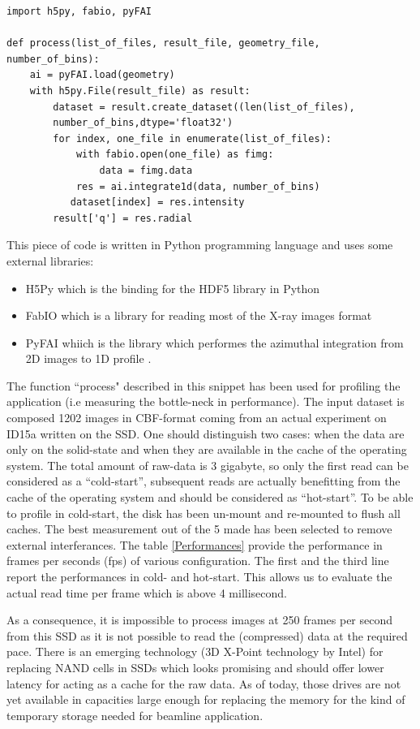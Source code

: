 \documentclass[preprint, pdf]{iucr}              %
\begin{document}
\label{sequential}
\begin{verbatim}
import h5py, fabio, pyFAI

def process(list_of_files, result_file, geometry_file, number_of_bins):
    ai = pyFAI.load(geometry)
    with h5py.File(result_file) as result:
        dataset = result.create_dataset((len(list_of_files),
        number_of_bins,dtype='float32') 
        for index, one_file in enumerate(list_of_files):
            with fabio.open(one_file) as fimg:
                data = fimg.data
            res = ai.integrate1d(data, number_of_bins)
           dataset[index] = res.intensity
        result['q'] = res.radial
\end{verbatim}

This piece of code is written in Python \cite{python} programming language and
uses some external libraries:
\begin{itemize}
  \item {H5Py} which is the binding for the HDF5 library in Python \cite{h5py}
  \item{FabIO} which is a library for reading most of the X-ray images format
  \cite{fabio}
  \item{PyFAI} whiich is the library which performes the azimuthal
  integration from 2D images to 1D profile \cite{pyFAI}. 
\end{itemize}

The function ``process" described in this snippet has been used for
profiling the application (i.e measuring the bottle-neck in performance). 
The input dataset is composed 1202 images in CBF-format coming from an actual
experiment on ID15a written on the SSD.
One should distinguish two cases: when the data are only on the
solid-state and when they are available in the cache of the
operating system.
The total amount of raw-data is 3 gigabyte, so only the first read can be
considered as a ``cold-start'', subsequent reads are actually benefitting from
the cache of the operating system and should be considered as ``hot-start''.
To be able to profile in cold-start, the disk has been un-mount and re-mounted
to flush all caches.
The best measurement out of the 5 made has been selected to remove external
interferances.
The table \ref{Performances} provide the performance in
frames per seconds (fps) of various configuration. 
The first and the third line report the performances in cold- and hot-start.
This allows us to evaluate the actual read time per frame which is above 4
millisecond.

As a consequence, it is impossible to process images at 250 frames per
second from this SSD as it is not possible to read the (compressed) data
at the required pace.
There is an emerging technology (3D X-Point technology by Intel) for replacing
NAND cells in SSDs which looks promising and should offer
lower latency for acting as a cache for the raw data. 
As of today, those drives are not yet available in capacities large
enough for replacing the memory for the kind of temporary storage needed for
beamline application.
\end{document}

